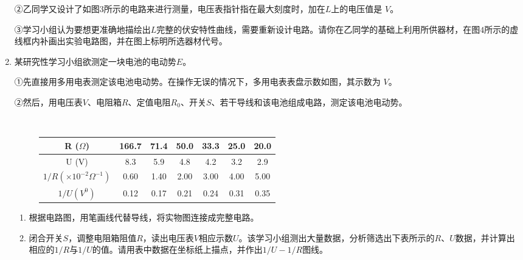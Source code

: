 \begin{enumerate}[leftmargin=0em]
②乙同学又设计了如图$ 3 $所示的电路来进行测量，电压表指针指在最大刻度时，加在$ L $上的电压值是  
$ V $。

③学习小组认为要想更准确地描绘出$ L $完整的伏安特性曲线，需要重新设计电路。请你在乙同学的基础上利用所供器材，在图$ 4 $所示的虚线框内补画出实验电路图，并在图上标明所选器材代号。






\newpage
\item
{}
某研究性学习小组欲测定一块电池的电动势$ E $。

①先直接用多用电表测定该电池电动势。在操作无误的情况下，多用电表表盘示数如图，其示数为  
$ V $。
\begin{figure}[h!]
\centering

\end{figure}

②然后，用电压表$ V $、电阻箱$ R $、定值电阻$ R_{0} $、开关$ S $、若干导线和该电池组成电路，测定该电池电动势。
\begin{figure}[h!]
\centering
\\
 \begin{tabular}{|c|c|c|c|c|c|c|}
\hline 
R ($ \Omega $) & 166.7 & 71.4 & 50.0 & 33.3 & 25.0 & 20.0
\\
\hline
U (V) & 8.3 & 5.9 & 4.8 & 4.2 & 3.2 & 2.9
\\
\hline
$1/R
( \times 10^{-2} \Omega ^{-1}) $ & 0.60 & 1.40 & 2.00 & 3.00 & 4.00 & 5.00
\\
\hline
$ 1/U(V^{0} ) $ & 0.12 & 0.17 & 0.21 & 0.24 & 0.31 & 0.35\\ 
\hline 
\end{tabular}
\end{figure}




\begin{enumerate}
\renewcommand{\labelenumi}{\arabic{enumi}.}
\item
根据电路图，用笔画线代替导线，将实物图连接成完整电路。
\item 
闭合开关$ S $，调整电阻箱阻值$ R $，读出电压表$ V $相应示数$ U $。该学习小组测出大量数据，分析筛选出下表所示的$ R $、$ U $数据，并计算出相应的$ 1/R $与$ 1/U $的值。请用表中数据在坐标纸上描点，并作出$ 1/U-1/R $图线。


\end{enumerate}
\end{enumerate}

